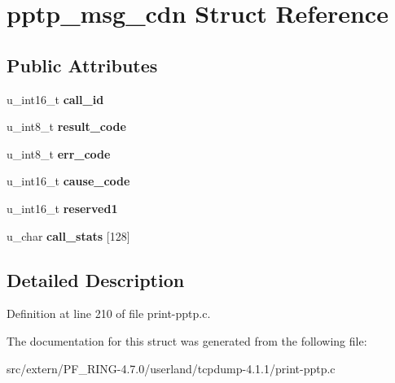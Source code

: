 \hypertarget{structpptp__msg__cdn}{
\section{pptp\_\-msg\_\-cdn Struct Reference}
\label{structpptp__msg__cdn}
}
\subsection*{Public Attributes}
\begin{DoxyCompactItemize}
\item 
\hypertarget{structpptp__msg__cdn_ad48a8afa4c0e89bfd8b0d196ce369c8f}{
u\_\-int16\_\-t {\bfseries call\_\-id}}
\label{structpptp__msg__cdn_ad48a8afa4c0e89bfd8b0d196ce369c8f}

\item 
\hypertarget{structpptp__msg__cdn_a923f862e9acd9ae3dbc37abacc262218}{
u\_\-int8\_\-t {\bfseries result\_\-code}}
\label{structpptp__msg__cdn_a923f862e9acd9ae3dbc37abacc262218}

\item 
\hypertarget{structpptp__msg__cdn_a5422a29f749c9a4ea43f7dbde0ce159a}{
u\_\-int8\_\-t {\bfseries err\_\-code}}
\label{structpptp__msg__cdn_a5422a29f749c9a4ea43f7dbde0ce159a}

\item 
\hypertarget{structpptp__msg__cdn_a11550b98f04e50c64bd2982196b3f4b0}{
u\_\-int16\_\-t {\bfseries cause\_\-code}}
\label{structpptp__msg__cdn_a11550b98f04e50c64bd2982196b3f4b0}

\item 
\hypertarget{structpptp__msg__cdn_a2f76ce126740f527bef685173c47a557}{
u\_\-int16\_\-t {\bfseries reserved1}}
\label{structpptp__msg__cdn_a2f76ce126740f527bef685173c47a557}

\item 
\hypertarget{structpptp__msg__cdn_a2a1d08e18e2b2dc1a3067e41319f407d}{
u\_\-char {\bfseries call\_\-stats} \mbox{[}128\mbox{]}}
\label{structpptp__msg__cdn_a2a1d08e18e2b2dc1a3067e41319f407d}

\end{DoxyCompactItemize}


\subsection{Detailed Description}


Definition at line 210 of file print-\/pptp.c.



The documentation for this struct was generated from the following file:\begin{DoxyCompactItemize}
\item 
src/extern/PF\_\-RING-\/4.7.0/userland/tcpdump-\/4.1.1/print-\/pptp.c\end{DoxyCompactItemize}
